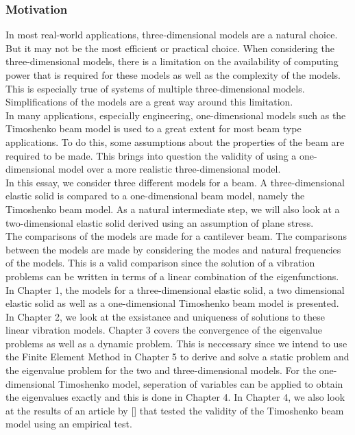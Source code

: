 \documentclass[../../main.tex]{subfiles}
\begin{document}
\subsubsection{Motivation}

In most real-world applications, three-dimensional models are a natural choice. But it may not be the most efficient or practical choice. When considering the three-dimensional models, there is a limitation on the availability of computing power that is required for these models as well as the complexity of the models. This is especially true of systems of multiple three-dimensional models. Simplifications of the models are a great way around this limitation.\\


In many applications, especially engineering, one-dimensional models such as the Timoshenko beam model is used to a great extent for most beam type applications. To do this, some assumptions about the properties of the beam are required to be made. This brings into question the validity of using a one-dimensional model over a more realistic three-dimensional model.\\

In this essay, we consider three different models for a beam. A three-dimensional elastic solid is compared to a one-dimensional beam model, namely the Timoshenko beam model. As a natural intermediate step, we will also look at a two-dimensional elastic solid derived using an assumption of plane stress.\\

The comparisons of the models are made for a cantilever beam. The comparisons between the models are made by considering the modes and natural frequencies of the models. This is a valid comparison since the solution of a vibration problems can be written in terms of a linear combination of the eigenfunctions.\\

In Chapter 1, the models for a three-dimensional elastic solid, a two dimensional elastic solid as well as a one-dimensional Timoshenko beam model is presented. In Chapter 2, we look at the exsistance and uniqueness of solutions to these linear vibration models. Chapter 3 covers the convergence of the eigenvalue problems as well as a dynamic problem. This is neccessary since we intend to use the Finite Element Method in Chapter 5 to derive and solve a static problem and the eigenvalue problem for the two and three-dimensional models. For the one-dimensional Timoshenko model, seperation of variables can be applied to obtain the eigenvalues exactly and this is done in Chapter 4. In Chapter 4, we also look at the results of an article by [] that tested the validity of the Timoshenko beam model using an empirical test.
\end{document}
